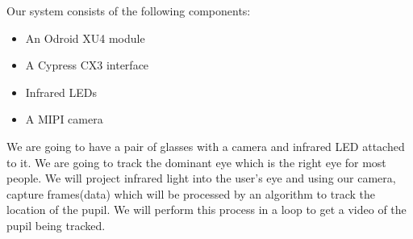 Our system consists of the following components:
\begin{itemize}
\item An Odroid XU4 module
\item A Cypress CX3 interface
\item Infrared LEDs
\item A MIPI camera
 \end{itemize}
We are going to have a pair of glasses with a camera and infrared LED attached to it. We are going to track the dominant eye which is the right eye for most people. We will project  infrared light into the user’s eye and using our camera, capture frames(data) which will be processed by an algorithm to track the location of the pupil. We will perform this process in a loop to get a video of the pupil being tracked. 
